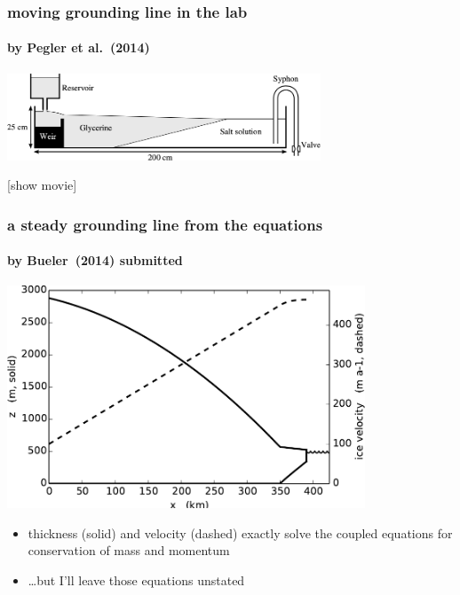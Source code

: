\documentclass{beamer}
\begin{document}
\begin{frame}
  \frametitle{moving grounding line in the lab}
  \framesubtitle{by Pegler et al.~(2014)}

\begin{center}

\includegraphics[width=0.7\textwidth]{pegler2014-grounding-line-schematic}

\vspace{1.0in}
[show movie]
\end{center}
\end{frame}


\begin{frame}
  \frametitle{a steady grounding line from the equations}
  \framesubtitle{by Bueler~(2014) submitted}

\begin{center}
\includegraphics[width=0.8\textwidth]{exactmarine-geometry}
\end{center}

\vspace{-0.2in}

\small
\begin{itemize}
\item thickness (solid) and velocity (dashed) exactly solve the coupled equations for conservation of mass and momentum
\item \dots but I'll leave those equations unstated
\end{itemize}
\normalsize
\end{frame}
\end{document}
